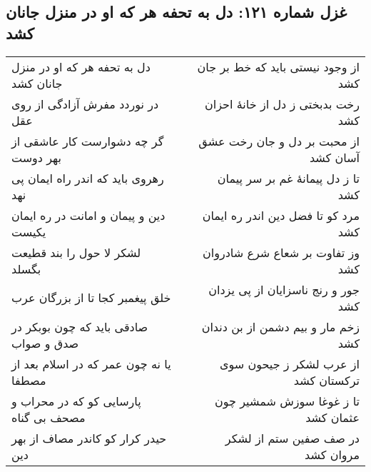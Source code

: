 \begin{center}
\section*{غزل شماره ۱۲۱: دل به تحفه هر که او در منزل جانان کشد}
\label{sec:121}
\begin{longtable}{l p{0.5cm} r}
دل به تحفه هر که او در منزل جانان کشد
&&
از وجود نیستی باید که خط بر جان کشد
\\
در نوردد مفرش آزادگی از روی عقل
&&
رخت بدبختی ز دل از خانهٔ احزان کشد
\\
گر چه دشوارست کار عاشقی از بهر دوست
&&
از محبت بر دل و جان رخت عشق آسان کشد
\\
رهروی باید که اندر راه ایمان پی نهد
&&
تا ز دل پیمانهٔ غم بر سر پیمان کشد
\\
دین و پیمان و امانت در ره ایمان یکیست
&&
مرد کو تا فضل دین اندر ره ایمان کشد
\\
لشکر لا حول را بند قطیعت بگسلد
&&
وز تفاوت بر شعاع شرع شادروان کشد
\\
خلق پیغمبر کجا تا از بزرگان عرب
&&
جور و رنج ناسزایان از پی یزدان کشد
\\
صادقی باید که چون بوبکر در صدق و صواب
&&
زخم مار و بیم دشمن از بن دندان کشد
\\
یا نه چون عمر که در اسلام بعد از مصطفا
&&
از عرب لشکر ز جیحون سوی ترکستان کشد
\\
پارسایی کو که در محراب و مصحف بی گناه
&&
تا ز غوغا سوزش شمشیر چون عثمان کشد
\\
حیدر کرار کو کاندر مصاف از بهر دین
&&
در صف صفین ستم از لشکر مروان کشد
\\
\end{longtable}
\end{center}
